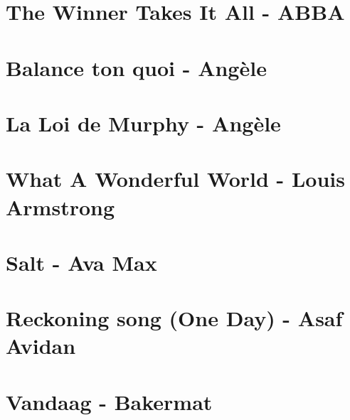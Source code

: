\documentclass[11pt]{article}
\begin{document}
\linespread{0.3}
\tableofcontents
\newpage


\section{The Winner Takes It All - ABBA}
\begin{guitar}

\end{guitar}

\section{Balance ton quoi - Angèle}
\begin{guitar}

\end{guitar}

\section{La Loi de Murphy - Angèle}
\begin{guitar}

\end{guitar}


\section*{What A Wonderful World - Louis Armstrong}
\begin{guitar}

\end{guitar}

\section{Salt - Ava Max}



\section{Reckoning song (One Day) - Asaf Avidan}
\begin{guitar}

\end{guitar}


\section{Vandaag - Bakermat}
\begin{guitar}

\end{guitar}
\end{document}
